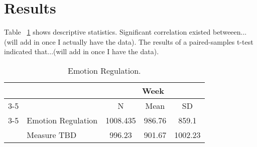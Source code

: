 \section{Results}
Table ~\ref{tab:RTmeans} shows descriptive statistics. Significant correlation existed betweeen... (will add in once I actually have the data). The results of a paired-samples t-test indicated that...(will add in once I have the data). 
\\


\begin{table}[h!]
\centering
\caption{\label{tab:RTmeans}Emotion Regulation.}
\begin{tabular}{l l c c c}
 \toprule
                          &              & \multicolumn{3}{c}{Week}\\
  \cmidrule{3-5}
                          &              & {N}           & {Mean}            & {SD}\\
  \cmidrule{3-5}
  \multirow{ 2}{*} & Emotion Regulation &     1008.435    &      986.76     &      859.1     \\
                   & Measure TBD        &     996.23      &      901.67     &      1002.23   \\
  \bottomrule
 \end{tabular}
\end{table}
